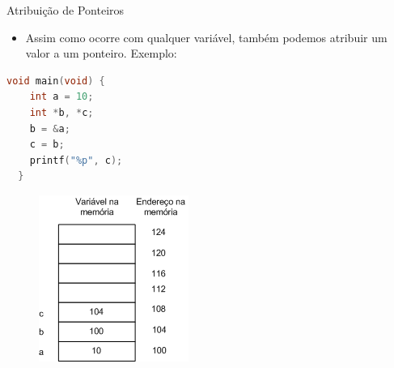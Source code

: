 \begin{frame}{Atribuição de Ponteiros}
  \begin{itemize}[<+->]
    \item Assim como ocorre com qualquer variável,
     também podemos atribuir um valor a um ponteiro. Exemplo:
  \end{itemize}
  
  \begin{minipage}[b]{0.45\linewidth}
  \begin{lstlisting}[language=C]
  void main(void) {
    int a = 10;
    int *b, *c;
    b = &a;
    c = b;
    printf("%p", c);
  }
  \end{lstlisting}
  \end{minipage}
  \hspace{0.1cm}
  \begin{minipage}[b]{0.45\linewidth}
      \begin{figure}[!ht]
       \includegraphics[width=.6\columnwidth]{figs/fig_ponteiros/exemplo-atribuicao-ponteiro}
      \end{figure}
    \end{minipage}  
\end{frame}

